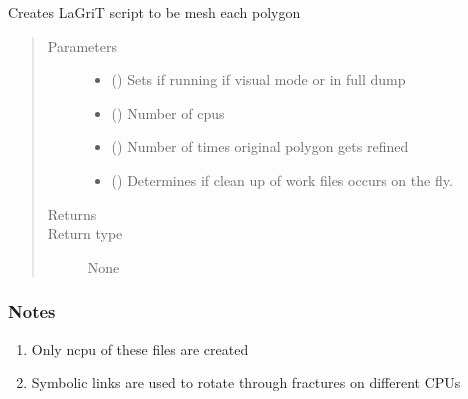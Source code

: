 \documentclass[letterpaper,10pt,english]{sphinxmanual}
\begin{document}
\begin{fulllineitems}
\label{\detokenize{pydfnworks:pydfnworks.dfnGen.lagrit_scripts.create_lagrit_scripts}}
Creates LaGriT script to be mesh each polygon
\begin{quote}\begin{description}
\item[{Parameters}] \leavevmode\begin{itemize}
\item {} 
 () \textendash{} Sets if running if visual mode or in full dump

\item {} 
 () \textendash{} Number of cpus

\item {} 
 () \textendash{} Number of times original polygon gets refined

\item {} 
 () \textendash{} Determines if clean up of work files occurs on the fly.

\end{itemize}

\item[{Returns}] \leavevmode


\item[{Return type}] \leavevmode
None

\end{description}\end{quote}
\subsubsection*{Notes}
\begin{enumerate}
\def\theenumi{\arabic{enumi}}
\def\labelenumi{\theenumi .}
\makeatletter\def\p@enumii{\p@enumi \theenumi .}\makeatother
\item {} 
Only ncpu of these files are created

\item {} 
Symbolic links are used to rotate through fractures on different CPUs

\end{enumerate}

\end{fulllineitems}
\end{document}
